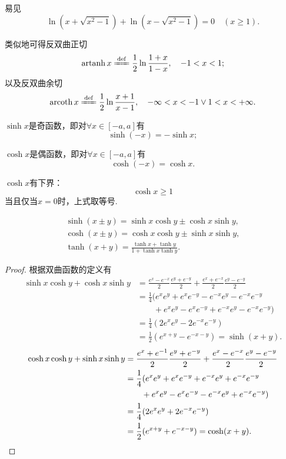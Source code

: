 易见\[
	\ln(x+\sqrt{x^2-1}) + \ln(x-\sqrt{x^2-1}) = 0
	\quad(x\geq1).
\]

类似地可得反双曲正切\[
	\artanh x
	\defeq
	\frac{1}{2} \ln\frac{1 + x}{1 - x},
	\quad -1<x<1;
\]
以及反双曲余切\[
	\arcoth x
	\defeq
	\frac{1}{2} \ln\frac{x + 1}{x - 1},
	\quad -\infty<x<-1\lor1<x<+\infty.
\]

\begin{property}
\(\sinh x\)是奇函数，即对\(\forall x \in [-a,a]\)有\[
	\sinh(-x) = -\sinh x;
\]

\(\cosh x\)是偶函数，即对\(\forall x \in [-a,a]\)有\[
	\cosh(-x) = \cosh x.
\]
\end{property}

\begin{property}
\(\cosh x\)有下界：\[
	\cosh x \geq 1
\]
当且仅当\(x=0\)时，上式取等号.
\end{property}

\begin{theorem}
\begin{gather}
	\sinh(x \pm y) = \sinh x\cosh y \pm \cosh x\sinh y, \\
	\cosh(x \pm y) = \cosh x\cosh y \pm \sinh x\sinh y, \\
	\tanh(x + y) = \frac{\tanh x + \tanh y}{1 + \tanh x\tanh y}.
\end{gather}
\begin{proof}
根据双曲函数的定义有
\begin{align*}
	\sinh x\cosh y+\cosh x\sinh y
	&= \frac{e^x - e^{-x}}{2} \frac{e^y + e^{-y}}{2}
		+ \frac{e^x + e^{-x}}{2} \frac{e^y - e^{-y}}{2} \\
	&= \frac{1}{4} (e^x e^y + e^x e^{-y} - e^{-x} e^y - e^{-x} e^{-y} \\
	&\qquad+ e^x e^y - e^x e^{-y} + e^{-x} e^y - e^{-x} e^{-y}) \\
	&= \frac{1}{4} (2 e^x e^y - 2 e^{-x} e^{-y}) \\
	&= \frac{1}{2} (e^{x+y} - e^{-x-y}) = \sinh(x+y).
\end{align*}
\begin{align*}
	\cosh x\cosh y+\sinh x\sinh y
	&= \frac{e^x + e^{-1}}{2} \frac{e^y + e^{-y}}{2}
		+ \frac{e^x - e^{-x}}{2} \frac{e^y - e^{-y}}{2} \\
	&= \frac{1}{4} (e^x e^y + e^x e^{-y} + e^{-x} e^y + e^{-x} e^{-y} \\
	&\qquad+ e^x e^y - e^x e^{-y} - e^{-x} e^y + e^{-x} e^{-y}) \\
	&= \frac{1}{4} (2 e^x e^y + 2 e^{-x} e^{-y}) \\
	&= \frac{1}{2} (e^{x+y} + e^{-x-y}) = \cosh(x+y).
	\qedhere
\end{align*}
\end{proof}
\end{theorem}

